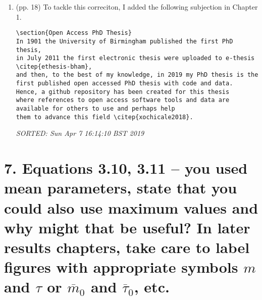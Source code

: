 \documentclass[12pt]{article}
\begin{document}
\begin{enumerate}

\item  (pp. 18)  To tackle this correciton, 
	I added the following subjection in Chapter 1. 

	\begin{verbatim}
\section{Open Access PhD Thesis}
In 1901 the University of Birmingham published the first PhD thesis, 
in July 2011 the first electronic thesis were uploaded to e-thesis 
\citep{ethesis-bham}, 
and then, to the best of my knowledge, in 2019 my PhD thesis is the 
first published open accessed PhD thesis with code and data.
Hence, a github repository has been created for this thesis 
where references to open access software tools and data are 
available for others to use and perhaps help 
them to advance this field \citep{xochicale2018}.

	\end{verbatim}
	\textit{
	SORTED:  Sun Apr  7 16:14:10 BST 2019
	}
	\\


\end{enumerate}



\section*{7. Equations 3.10, 3.11 -- you used mean parameters,
state that you could also use maximum values and why 
might that be useful?
In later results chapters, take care to label figures
with appropriate symbols $m$ and $\tau$ or 
$\overline{m}_0$ and $\overline{\tau}_0$, etc.
}


%
\end{document}
